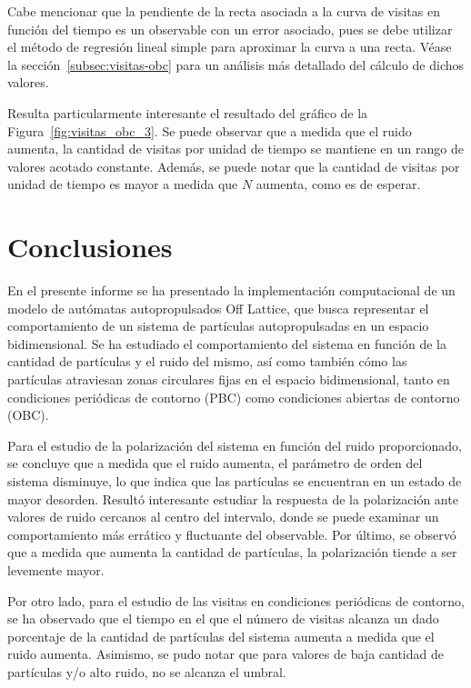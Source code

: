\documentclass[11pt, a4paper]{article}
\begin{document}
            Cabe mencionar que la pendiente de la recta asociada a la curva de visitas en función del tiempo es un
            observable con un error asociado, pues se debe utilizar el método de regresión lineal simple para aproximar
            la curva a una recta.
            Véase la sección~\ref{subsec:visitas-obc} para un análisis más detallado del cálculo de dichos valores.

            Resulta particularmente interesante el resultado del gráfico de la Figura~\ref{fig:visitas_obc_3}.
            Se puede observar que a medida que el ruido aumenta, la cantidad de visitas por unidad de tiempo se mantiene
            en un rango de valores acotado constante.
            Además, se puede notar que la cantidad de visitas por unidad de tiempo es mayor a medida que $N$ aumenta,
            como es de esperar.

    \newpage

    \section{Conclusiones}
    \label{sec:conclusiones}

        En el presente informe se ha presentado la implementación computacional de un modelo de autómatas autopropulsados
        Off Lattice, que busca representar el comportamiento de un sistema de partículas autopropulsadas en un espacio
        bidimensional.
        Se ha estudiado el comportamiento del sistema en función de la cantidad de partículas y el ruido del mismo, así como
        también cómo las partículas atraviesan zonas circulares fijas en el espacio bidimensional, tanto en condiciones
        periódicas de contorno (PBC) como condiciones abiertas de contorno (OBC).

        Para el estudio de la polarización del sistema en función del ruido proporcionado, se concluye que a medida que
        el ruido aumenta, el parámetro de orden del sistema disminuye, lo que indica que las partículas se encuentran en
        un estado de mayor desorden.
        Resultó interesante estudiar la respuesta de la polarización ante valores de ruido cercanos al centro del
        intervalo, donde se puede examinar un comportamiento más errático y fluctuante del observable.
        Por último, se observó que a medida que aumenta la cantidad de partículas, la polarización tiende a ser
        levemente mayor.

        Por otro lado, para el estudio de las visitas en condiciones periódicas de contorno, se ha observado que el
        tiempo en el que el número de visitas alcanza un dado porcentaje de la cantidad de partículas del sistema aumenta
        a medida que el ruido aumenta.
        Asimismo, se pudo notar que para valores de baja cantidad de partículas y/o alto ruido, no se alcanza el umbral.
\end{document}
